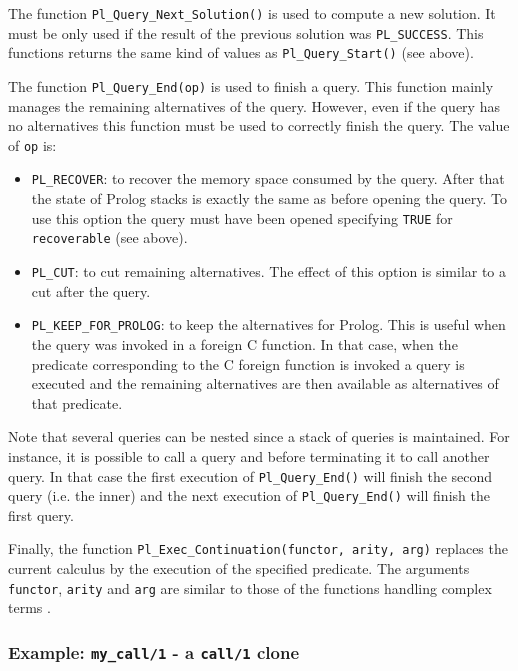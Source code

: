 The function \texttt{Pl\_Query\_Next\_Solution()} is used to compute a new
solution. It must be only used if the result of the previous solution was
\texttt{PL\_SUCCESS}. This functions returns the same kind of values as
\texttt{Pl\_Query\_Start()} (see above).

The function \texttt{Pl\_Query\_End(op)} is used to finish a query. This
function mainly manages the remaining alternatives of the query. However,
even if the query has no alternatives this function must be used to
correctly finish the query. The value of \texttt{op} is:

\begin{itemize}

\item \texttt{PL\_RECOVER}: to recover the memory space consumed by the
query. After that the state of Prolog stacks is exactly the same as before
opening the query. To use this option the query must have been opened
specifying \texttt{TRUE} for \texttt{recoverable} (see above).

\item \texttt{PL\_CUT}: to cut remaining alternatives. The effect of this
option is similar to a cut after the query.

\item \texttt{PL\_KEEP\_FOR\_PROLOG}: to keep the alternatives for Prolog.
This is useful when the query was invoked in a foreign C function. In that
case, when the predicate corresponding to the C foreign function is invoked
a query is executed and the remaining alternatives are then available as
alternatives of that predicate.

\end{itemize}

Note that several queries can be nested since a stack of queries is
maintained. For instance, it is possible to call a query and before
terminating it to call another query. In that case the first execution of
\texttt{Pl\_Query\_End()} will finish the second query (i.e. the inner) and
the next execution of \texttt{Pl\_Query\_End()} will finish the first query.

Finally, the function \texttt{Pl\_Exec\_Continuation(functor, arity,
arg)} replaces the current calculus by the execution of the specified
predicate. The arguments \texttt{functor}, \texttt{arity} and
\texttt{arg} are similar to those of the functions handling complex
terms .

\subsubsection{Example: \texttt{my\_call/1} - a \texttt{call/1} clone}

